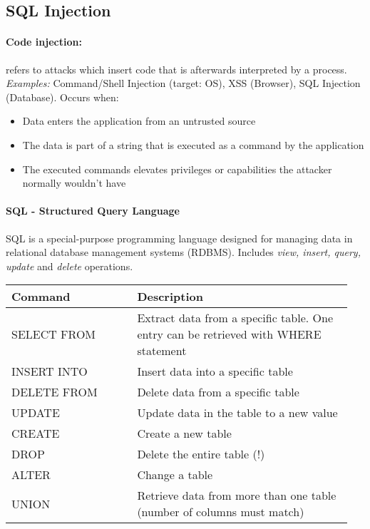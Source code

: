 \subsection{SQL Injection}

\paragraph{Code injection:} refers to attacks which insert code that is afterwards interpreted by a process. \emph{Examples:} Command/Shell Injection (target: OS), XSS (Browser), SQL Injection (Database). Occurs when:
\begin{itemize}
\item Data enters the application from an untrusted source
\item The data is part of a string that is executed as a command by the application
\item The executed commands elevates privileges or capabilities the attacker normally wouldn't have
\end{itemize}

\paragraph{SQL - Structured Query Language} SQL is a special-purpose programming language designed for managing data in relational database management systems (RDBMS). Includes \emph{view, insert, query, update} and \emph{delete} operations.

\begin{tabular}{p{0.35\linewidth}p{0.6\linewidth}}
Command & Description \\
\hline
\hline
SELECT FROM & Extract data from a specific table. One entry can be retrieved with WHERE statement \\
INSERT INTO & Insert data into a specific table \\
DELETE FROM & Delete data from a specific table\\
UPDATE & Update data in the table to a new value \\
CREATE & Create a new table\\
DROP & Delete the entire table (!) \\
ALTER & Change a table \\
UNION & Retrieve data from more than one table (number of columns must match) \\
\end{tabular}

